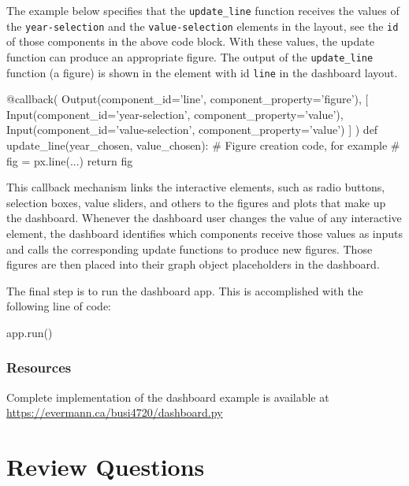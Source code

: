 The example below specifies that the \texttt{update\_line} function receives the values of the \texttt{year-selection} and the \texttt{value-selection} elements in the layout, see the \texttt{id} of those components in the above code block. With these values, the update function can produce an appropriate figure. The output of the \texttt{update\_line} function (a figure) is shown in the element with id \texttt{line} in the dashboard layout. 

\begin{samepage}
\begin{pythoncode}
@callback(
    Output(component_id='line', component_property='figure'),
    [
        Input(component_id='year-selection', 
              component_property='value'),
        Input(component_id='value-selection', 
              component_property='value')
    ]
)
def update_line(year_chosen, value_chosen): 
    # Figure creation code, for example
    # fig = px.line(...)
    return fig
\end{pythoncode}
\end{samepage}

This callback mechanism links the interactive elements, such as radio buttons, selection boxes, value sliders, and others to the figures and plots that make up the dashboard. Whenever the dashboard user changes the value of any interactive element, the dashboard identifies which components receive those values as inputs and calls the corresponding update functions to produce new figures. Those figures are then placed into their graph object placeholders in the dashboard. 

The final step is to run the dashboard app. This is accomplished with the following line of code:

\begin{pythoncode}
app.run()
\end{pythoncode}

\begin{tcolorbox}[colback=alert]
\subsubsection*{Resources}
Complete implementation of the dashboard example is available at
\url{https://evermann.ca/busi4720/dashboard.py} \\
\end{tcolorbox}


\section{Review Questions}

